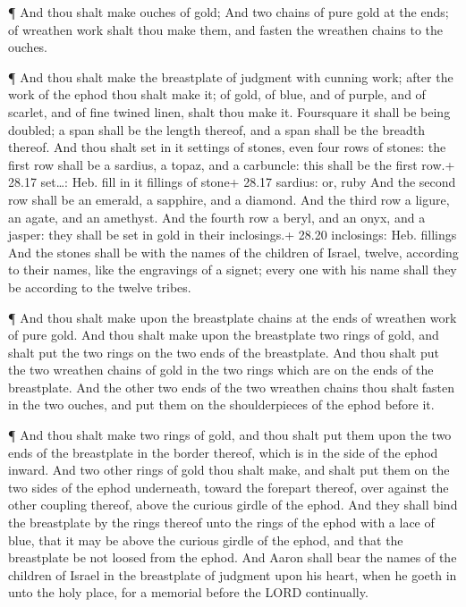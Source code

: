  ¶ And thou shalt make ouches of gold;  And
two chains of pure gold at the ends; of wreathen work shalt thou make
them, and fasten the wreathen chains to the ouches.

 ¶ And thou shalt make the breastplate of judgment with
cunning work; after the work of the ephod thou shalt make it; of gold,
of blue, and of purple, and of scarlet, and of fine twined linen, shalt
thou make it.  Foursquare it shall be being doubled; a span
shall be the length thereof, and a span shall be the breadth thereof.
 And thou shalt set in it settings of stones, even four
rows of stones: the first row shall be a sardius, a topaz, and a
carbuncle: this shall be the first row.+ 28.17 set\ldots: Heb. fill in
it fillings of stone+ 28.17 sardius: or, ruby  And the
second row shall be an emerald, a sapphire, and a diamond. 
And the third row a ligure, an agate, and an amethyst.  And
the fourth row a beryl, and an onyx, and a jasper: they shall be set in
gold in their inclosings.+ 28.20 inclosings: Heb. fillings 
And the stones shall be with the names of the children of Israel,
twelve, according to their names, like the engravings of a signet; every
one with his name shall they be according to the twelve tribes.

 ¶ And thou shalt make upon the breastplate chains at the
ends of wreathen work of pure gold.  And thou shalt make
upon the breastplate two rings of gold, and shalt put the two rings on
the two ends of the breastplate.  And thou shalt put the
two wreathen chains of gold in the two rings which are on the ends of
the breastplate.  And the other two ends of the two
wreathen chains thou shalt fasten in the two ouches, and put them on the
shoulderpieces of the ephod before it.

 ¶ And thou shalt make two rings of gold, and thou shalt
put them upon the two ends of the breastplate in the border thereof,
which is in the side of the ephod inward.  And two other
rings of gold thou shalt make, and shalt put them on the two sides of
the ephod underneath, toward the forepart thereof, over against the
other coupling thereof, above the curious girdle of the ephod.
 And they shall bind the breastplate by the rings thereof
unto the rings of the ephod with a lace of blue, that it may be above
the curious girdle of the ephod, and that the breastplate be not loosed
from the ephod.  And Aaron shall bear the names of the
children of Israel in the breastplate of judgment upon his heart, when
he goeth in unto the holy place, for a memorial before the LORD
continually.

